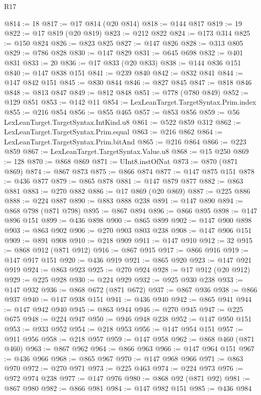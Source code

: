 \begin{lexlean}{R17}
\begin{coremodule}
@814 := 18
@817 := @17 @814 (@20 @814)
@818 := @144 @817
@819 := 19
@822 := @17 @819 (@20 @819)
@823 := @212 @822
@824 := @173 @314
@825 := @150 @824
@826 := @823 @825
@827 := @147 @826
@828 := @313 @805
@829 := @786 @828
@830 := @147 @829
@831 := @645 @698
@832 := @401 @831
@833 := 20
@836 := @17 @833 (@20 @833)
@838 := @144 @836 @151
@840 := @147 @838 @151
@841 := @239 @840
@842 := @832 @841
@844 := @147 @842 @151
@845 := @830 @844
@846 := @827 @845
@847 := @818 @846
@848 := @813 @847
@849 := @812 @848
@851 := @778 (@780 @849)
@852 := @129 @851
@853 := @142 @11
@854 := LexLeanTarget.TargetSyntax.Prim.index
@855 := @216 @854
@856 := @855 @465
@857 := @853 @856
@859 := @56 LexLeanTarget.TargetSyntax.IntKind.u8
@861 := @522 @859 @312
@862 := LexLeanTarget.TargetSyntax.Prim.equal
@863 := @216 @862
@864 := LexLeanTarget.TargetSyntax.Prim.bitAnd
@865 := @216 @864
@866 := @223 @859
@867 := LexLeanTarget.TargetSyntax.Value.u8
@868 := @15 @250
@869 := 128
@870 := @868 @869
@871 := UInt8.instOfNat
@873 := @870 (@871 @869)
@874 := @867 @873
@875 := @866 @874
@877 := @147 @875 @151
@878 := @436 @877
@879 := @865 @878
@881 := @147 @879 @877
@882 := @863 @881
@883 := @270 @882
@886 := @17 @869 (@20 @869)
@887 := @225 @886
@888 := @224 @887
@890 := @883 @888 @238
@891 := @147 @890
@894 := @868 @798 (@871 @798)
@895 := @867 @894
@896 := @866 @895
@898 := @147 @896 @151
@899 := @436 @898
@900 := @865 @899
@902 := @147 @900 @898
@903 := @863 @902
@906 := @270 @903 @803 @238
@908 := @147 @906 @151
@909 := @891 @908
@910 := @218 @909
@911 := @147 @910
@912 := 32
@915 := @868 @912 (@871 @912)
@916 := @867 @915
@917 := @866 @916
@919 := @147 @917 @151
@920 := @436 @919
@921 := @865 @920
@923 := @147 @921 @919
@924 := @863 @923
@925 := @270 @924
@928 := @17 @912 (@20 @912)
@929 := @225 @928
@930 := @224 @929
@932 := @925 @930 @238
@933 := @147 @932
@936 := @868 @672 (@871 @672)
@937 := @867 @936
@938 := @866 @937
@940 := @147 @938 @151
@941 := @436 @940
@942 := @865 @941
@944 := @147 @942 @940
@945 := @863 @944
@946 := @270 @945
@947 := @225 @675
@948 := @224 @947
@950 := @946 @948 @238
@952 := @147 @950 @151
@953 := @933 @952
@954 := @218 @953
@956 := @147 @954 @151
@957 := @911 @956
@958 := @218 @957
@959 := @147 @958
@962 := @868 @460 (@871 @460)
@963 := @867 @962
@964 := @866 @963
@966 := @147 @964 @151
@967 := @436 @966
@968 := @865 @967
@970 := @147 @968 @966
@971 := @863 @970
@972 := @270 @971
@973 := @225 @463
@974 := @224 @973
@976 := @972 @974 @238
@977 := @147 @976
@980 := @868 @92 (@871 @92)
@981 := @867 @980
@982 := @866 @981
@984 := @147 @982 @151
@985 := @436 @984

\end{coremodule}
\end{lexlean}
